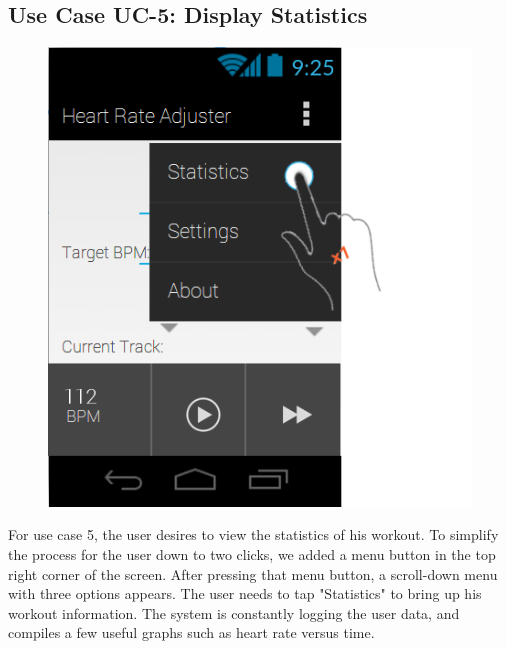 \documentclass[letterpaper,english, 12pt]{scrreprt}
\begin{document}
\subsection{Use Case UC-5: Display Statistics}

\begin{figure}[H]
	\centering
	\includegraphics{img/Prelim_Design/PrelimDesign_4.png}\\
\end{figure}

For use case 5, the user desires to view the statistics of his workout.
To simplify the process for the user down to two clicks, we added a menu button in the top right corner of the screen.
After pressing that menu button, a scroll-down menu with three options appears.
The user needs to tap "Statistics" to bring up his workout information.
The system is constantly logging the user data, and compiles a few useful graphs such as heart rate versus time.
\end{document}
